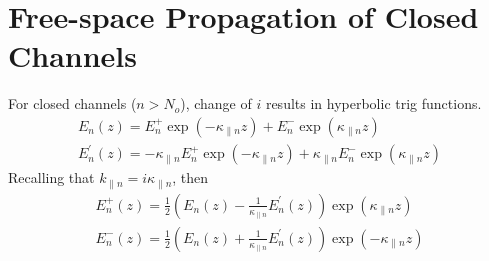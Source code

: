 \section{Free-space Propagation of Closed Channels}
For closed channels ($n > N_o$), change of $i$ results in hyperbolic trig functions.
\begin{equation}
\begin{gathered}
E_n(z) = E_n^+ \exp(-\kappa_{\parallel n} z) + E_n^- \exp(\kappa_{\parallel n} z) \\
E_n^{\prime}(z) = -\kappa_{\parallel n} E_n^+ \exp(-\kappa_{\parallel n} z) + \kappa_{\parallel n}E_n^- \exp(\kappa_{\parallel n} z)
\end{gathered}
\end{equation}
Recalling that $k_{\parallel n} = i \kappa_{\parallel n}$, then
\begin{equation}
\begin{gathered}
E_n^+(z) = \frac{1}{2} \left( E_n(z)- \frac{1}{\kappa_{\parallel n}} E_n^{\prime}(z) \right) \exp(\kappa_{\parallel n} z) \\ 
E_n^-(z) = \frac{1}{2} \left( E_n(z)+ \frac{1}{\kappa_{\parallel n}} E_n^{\prime}(z) \right) \exp(-\kappa_{\parallel n} z) 
\end{gathered}
\end{equation}

